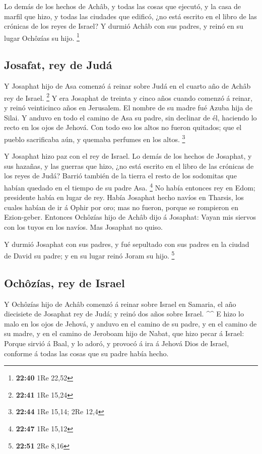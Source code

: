  Lo demás de los hechos de Achâb, y todas las cosas que
ejecutó, y la casa de marfil que hizo, y todas las ciudades que edificó,
¿no está escrito en el libro de las crónicas de los reyes de Israel?
 Y durmió Achâb con sus padres, y reinó en su lugar
Ochôzías su hijo. \footnote{\textbf{22:40} 1Re 22,52}

\hypertarget{josafat-rey-de-juduxe1}{%
\subsection{Josafat, rey de Judá}\label{josafat-rey-de-juduxe1}}

 Y Josaphat hijo de Asa comenzó á reinar sobre Judá en el
cuarto año de Achâb rey de Israel. \footnote{\textbf{22:41} 1Re 15,24}
 Y era Josaphat de treinta y cinco años cuando comenzó á
reinar, y reinó veinticinco años en Jerusalem. El nombre de su madre fué
Azuba hija de Silai.  Y anduvo en todo el camino de Asa su
padre, sin declinar de él, haciendo lo recto en los ojos de Jehová.
 Con todo eso los altos no fueron quitados; que el pueblo
sacrificaba aún, y quemaba perfumes en los altos. \footnote{\textbf{22:44}
  1Re 15,14; 2Re 12,4}

 Y Josaphat hizo paz con el rey de Israel.  Lo
demás de los hechos de Josaphat, y sus hazañas, y las guerras que hizo,
¿no está escrito en el libro de las crónicas de los reyes de Judá?
 Barrió también de la tierra el resto de los sodomitas que
habían quedado en el tiempo de su padre Asa. \footnote{\textbf{22:47}
  1Re 15,12}  No había entonces rey en Edom; presidente
había en lugar de rey.  Había Josaphat hecho navíos en
Tharsis, los cuales habían de ir á Ophir por oro; mas no fueron, porque
se rompieron en Ezion-geber.  Entonces Ochôzías hijo de
Achâb dijo á Josaphat: Vayan mis siervos con los tuyos en los navíos.
Mas Josaphat no quiso.

 Y durmió Josaphat con sus padres, y fué sepultado con sus
padres en la ciudad de David su padre; y en su lugar reinó Joram su
hijo. \footnote{\textbf{22:51} 2Re 8,16}

\hypertarget{ochuxf4zuxedas-rey-de-israel}{%
\subsection{Ochôzías, rey de
Israel}\label{ochuxf4zuxedas-rey-de-israel}}

 Y Ochôzías hijo de Achâb comenzó á reinar sobre Israel en
Samaria, el año diecisiete de Josaphat rey de Judá; y reinó dos años
sobre Israel. \^{}\^{}  E hizo lo malo en los ojos de
Jehová, y anduvo en el camino de su padre, y en el camino de su madre, y
en el camino de Jeroboam hijo de Nabat, que hizo pecar á Israel: Porque
sirvió á Baal, y lo adoró, y provocó á ira á Jehová Dios de Israel,
conforme á todas las cosas que su padre había hecho.
